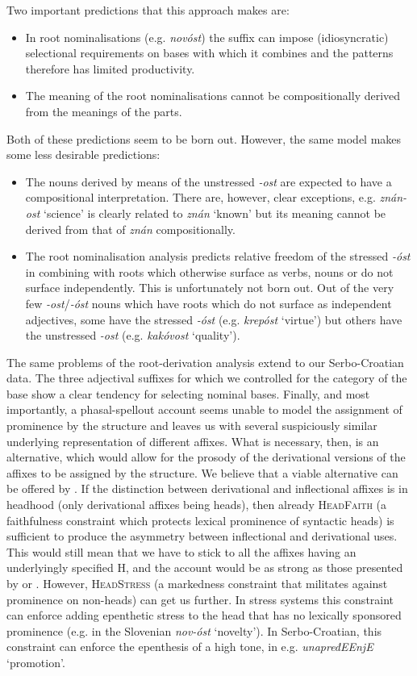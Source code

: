 \documentclass[output=paper]{langsci/langscibook}
\begin{document}
Two important predictions that this approach makes are: \begin{itemize}
\item In root nominalisations (e.g. \textit{novóst}) the suffix can impose (idiosyncratic) selectional requirements on bases with which it combines and the patterns therefore has limited productivity. 
\item The meaning of the root nominalisations cannot be compositionally derived from the meanings of the parts.
\end{itemize}

Both of these predictions seem to be born out. However, the same model makes some less desirable predictions: 
\begin{itemize}
\item The nouns derived by means of the unstressed \textit{-ost} are expected to have a compositional interpretation. There are, however, clear exceptions, e.g. \textit{znán-ost} `science' is clearly related to \textit{znán} `known' but its meaning cannot be derived from that of \textit{znán} compositionally. 
\item The root nominalisation analysis predicts relative freedom of the stressed \textit{-óst} in combining with roots which otherwise surface as verbs, nouns or do not surface independently. This is unfortunately not born out. Out of the very few \textit{-ost}/\textit{-óst} nouns which have roots which do not surface as independent adjectives, some have the stressed \textit{-óst} (e.g. \textit{krepóst} `virtue') but others have the unstressed \textit{-ost} (e.g. \textit{kakóvost} `quality'). 
\end{itemize}
The same problems of the root-derivation analysis extend to our Serbo-Croatian data. The three adjectival suffixes for which we controlled for the category of the base show a clear tendency for selecting nominal bases. Finally, and most importantly, a phasal-spellout account seems unable to model the assignment of prominence by the structure and leaves us with several suspiciously similar underlying representation of different affixes. 
What is necessary, then, is an alternative, which would allow for the prosody of the derivational versions of the affixes to be assigned by the structure.  We believe that a viable alternative can be offered by \cite{Revithiadou1999}. If the distinction between derivational and inflectional affixes is in headhood (only derivational affixes being heads), then already \textsc{HeadFaith}  (a faithfulness constraint which protects lexical prominence of syntactic heads) is sufficient to produce the asymmetry between inflectional and derivational uses. This would still mean that we have to stick to all the affixes having an underlyingly specified H, and the account would be as strong as those presented by \cite{Mar2002} or \citet{Arsim2013}. However, 
\textsc{HeadStress} (a markedness constraint that militates against prominence on non-heads) can get us further. In stress systems this constraint can enforce adding epenthetic stress to the head that has no lexically sponsored prominence (e.g. in the Slovenian \textit{nov-óst} `novelty'). In Serbo-Croatian, this constraint can enforce the epenthesis of a high tone, in e.g. \textit{unapređEEnjE} `promotion'. 
\end{document}

